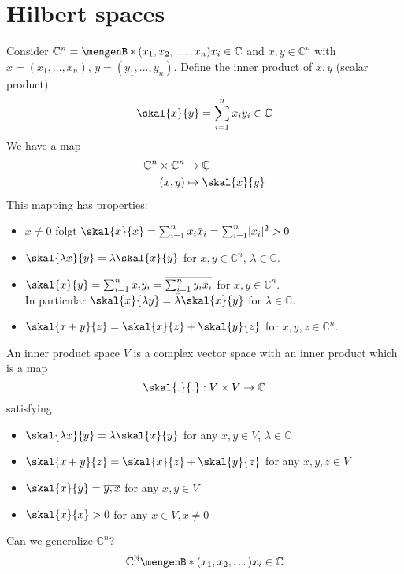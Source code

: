 \section{Hilbert spaces} 
\label{sec:hilbert_spaces}
\begin{beispiel}
	Consider $\mathbb{C}^n = \set[(x_1,x_2,\dots,x_n)]{x_i \in \mathbb{C}}$ and $x,y \in \mathbb{C}^n$ with
	$x= (x_1,\dots,x_n)$, $y = (y_1,\dots,y_n)$. Define the inner product of $x,y$ (scalar product)
	\[
		\skal{x}{y} = \sum^{n}_{i=1}x_i \bar{y}_i \in \mathbb{C}
	\]
	We have a map
	\begin{align*}
		\mathbb{C}^n \times \mathbb{C}^n &\to \mathbb{C} \\
		(x,y) &\mapsto \skal{x}{y}
	\end{align*}
	This mapping has properties:
	\begin{itemize}
		\item $x \neq 0$ folgt $\skal{x}{x} = \sum^{n}_{i=1}x_i \bar{x}_i = \sum^{n}_{i=1} \abs{x_i}^2 >0$
		\item $\skal{\lambda x}{y} = \lambda \skal{x}{y}$ for $x,y \in \mathbb{C}^n$, $\lambda \in \mathbb{C}$.
		\item $\skal{x}{y} = \sum^{n}_{i=1} x_i \bar{y}_i = \overline{\sum^{n}_{i=1}y_i \bar{x}_i}$ for $x,y \in \mathbb{C}^n$. \\
		In particular $\skal{x}{\lambda y} = \bar{\lambda} \skal{x}{y}$ for $\lambda \in \mathbb{C}$.
		\item $\skal{x+y}{z} = \skal{x}{z}+ \skal{y}{z}$ for $x,y,z \in \mathbb{C}^n$. 
	\end{itemize}
\end{beispiel}
\begin{definition}
	An inner product space $V$ is a complex vector space with an inner product which is a map 
	\[
		\skal{.}{.}: V \times V \to \mathbb{C}
	\]
	satisfying
	\begin{itemize}
		\item $\skal{\lambda x}{y} = \lambda \skal{x}{y}$ for any $x,y \in V$, $\lambda \in \mathbb{C}$
		\item $\skal{x+y}{z} = \skal{x}{z}+ \skal{y}{z}$ for any $x,y,z \in V$
		\item $\skal{x}{y} = \overline{y,x}$ for any $x,y \in V$
		\item $\skal{x}{x}>0$ for any $x \in V, x \neq 0$
	\end{itemize}
\end{definition}
Can we generalize $\mathbb{C}^n$? \\
\[
	\mathbb{C}^{\mathbb{N}} \set[(x_1,x_2, \dots)]{x_i \in \mathbb{C}}
\]
